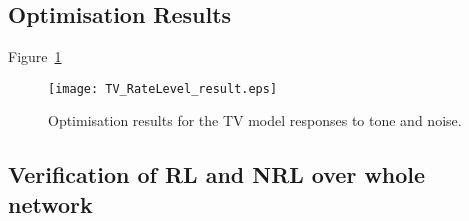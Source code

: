 


\subsection{Optimisation Results}

Figure~\ref{fig:TV_RL_result} 

\begin{figure}[htb]
\centering
\texttt{[image: TV\_RateLevel\_result.eps]}
\caption[]{Optimisation results for the TV model responses to tone and noise.}\label{fig:TV_RL_result}
\end{figure}


\subsection{Verification of RL and NRL over whole network}



